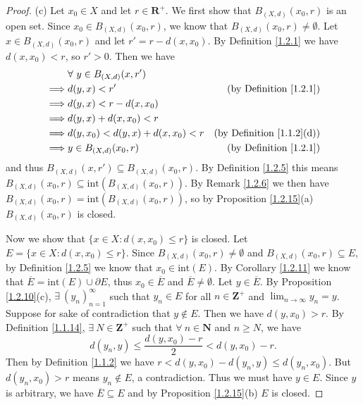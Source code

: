 \begin{proof}{(c)}
    Let \(x_0 \in X\) and let \(r \in \mathbf{R}^+\).
    We first show that \(B_{(X, d)}(x_0, r)\) is an open set.
    Since \(x_0 \in B_{(X, d)}(x_0, r)\), we know that \(B_{(X, d)}(x_0, r) \neq \emptyset\).
    Let \(x \in B_{(X, d)}(x_0, r)\) and let \(r' = r - d(x, x_0)\).
    By Definition \ref{1.2.1} we have \(d(x, x_0) < r\), so \(r' > 0\).
    Then we have
    \begin{align*}
                 & \forall\ y \in B_{(X, d)}(x, r')                                            \\
        \implies & d(y, x) < r'                        & \text{(by Definition \ref{1.2.1})}    \\
        \implies & d(y, x) < r - d(x, x_0)                                                     \\
        \implies & d(y, x) + d(x, x_0) < r                                                     \\
        \implies & d(y, x_0) < d(y, x) + d(x, x_0) < r & \text{(by Definition \ref{1.1.2}(d))} \\
        \implies & y \in B_{(X, d)}(x_0, r)            & \text{(by Definition \ref{1.2.1})}
    \end{align*}
    and thus \(B_{(X, d)}(x, r') \subseteq B_{(X, d)}(x_0, r)\).
    By Definition \ref{1.2.5} this means \(B_{(X, d)}(x_0, r) \subseteq \text{int}(B_{(X, d)}(x_0, r))\).
    By Remark \ref{1.2.6} we then have \(B_{(X, d)}(x_0, r) = \text{int}(B_{(X, d)}(x_0, r))\), so by Proposition \ref{1.2.15}(a) \(B_{(X, d)}(x_0, r)\) is closed.

    Now we show that \(\{x \in X : d(x, x_0) \leq r\}\) is closed.
    Let \(E = \{x \in X : d(x, x_0) \leq r\}\).
    Since \(B_{(X, d)}(x_0, r) \neq \emptyset\) and \(B_{(X, d)}(x_0, r) \subseteq E\), by Definition \ref{1.2.5} we know that \(x_0 \in \text{int}(E)\).
    By Corollary \ref{1.2.11} we know that \(\overline{E} = \text{int}(E) \cup \partial E\), thus \(x_0 \in \overline{E}\) and \(\overline{E} \neq \emptyset\).
    Let \(y \in \overline{E}\).
    By Proposition \ref{1.2.10}(c), \(\exists\ (y_n)_{n = 1}^\infty\) such that \(y_n \in E\) for all \(n \in \mathbf{Z}^+\) and \(\lim_{n \to \infty} y_n = y\).
    Suppose for sake of contradiction that \(y \notin E\).
    Then we have \(d(y, x_0) > r\).
    By Definition \ref{1.1.14}, \(\exists\ N \in \mathbf{Z}^+\) such that \(\forall\ n \in \mathbf{N}\) and \(n \geq N\), we have
    \[
        d(y_n, y) \leq \frac{d(y, x_0) - r}{2} < d(y, x_0) - r.
    \]
    Then by Definition \ref{1.1.2} we have \(r < d(y, x_0) - d(y_n, y) \leq d(y_n, x_0)\).
    But \(d(y_n, x_0) > r\) means \(y_n \notin E\), a contradiction.
    Thus we must have \(y \in E\).
    Since \(y\) is arbitrary, we have \(\overline{E} \subseteq E\) and by Proposition \ref{1.2.15}(b) \(E\) is closed.
\end{proof}

